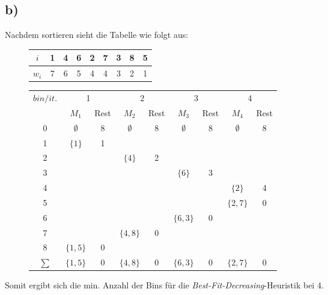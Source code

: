 \documentclass[12pt]{article}
\begin{document}
	\subsection{b)}
	Nachdem sortieren sieht die Tabelle wie folgt aus:
	\begin{figure}[H]
		\centering
		\begin{tabular}{c | c c c c c c c c}
			$i$   & 1 & 4 & 6 & 2 & 7 & 3 & 8 & 5 \\ \hline
			$w_i$ & 7 & 6 & 5 & 4 & 4 & 3 & 2 & 1 \\
		\end{tabular}
	
	
		\begin{tabular}{c || c  c | c  c | c c | c c }
			$bin/it.$ &  \multicolumn{2}{c}{1} & \multicolumn{2}{c}{2} & \multicolumn{2}{c}{3} & \multicolumn{2}{c}{4} \\ 
			& $M_1$ & Rest & $M_2$ & Rest & $M_3$ & Rest & $M_4$ & Rest  \\ \hline\hline
			0 & $\emptyset$ & 8 &  $\emptyset$ & 8 &  $\emptyset$ & 8 &  $\emptyset$ & 8   \\
			1 & $\{1\}$ & 1	& $ $ & $ $ 		& $ $ & $ $ 		& $ $ & $ $\\
			2 & $ $ & $ $ 	& $\{4\}$ & 2 		& $ $ & $ $ 		& $ $ & $ $\\
			3 & $ $ & $ $ 	& $ $ & $ $			& $\{6\} $ & 3 		& $ $ & $ $\\
			4 & $ $ & $ $ 	& $ $ & $ $ 		& $ $ & $ $  		& $\{2\} $ & 4\\
			5 & $ $ & $ $	& $ $ & $ $ 		& $ $ & $ $ 		& $\{2,7\} $ & 0\\
			6 & $ $ & $ $ 	& $ $ & $ $ 		& $\{6,3\}$ & 0 		& $ $ & $ $\\
			7 & $ $ & $ $ 	& $\{4,8\} $ & 0 		& $ $ & $ $  		& $ $ & $ $\\
			8 & $\{1,5\} $ & 0 	& $ $ & $ $ 		& $ $ & $ $ 		& $ $ & $ $\\ \hline\hline
			$\sum$ & $\{1,5\}$ & 0 & $\{4,8\}$ & 0 & $\{6,3\}$ & 0 & $\{2,7\}$& 0 \\
		\end{tabular}
	\end{figure}
	Somit ergibt sich die min. Anzahl der Bins für die \textit{Best-Fit-Decreasing}-Heuristik bei 4.
\end{document}
